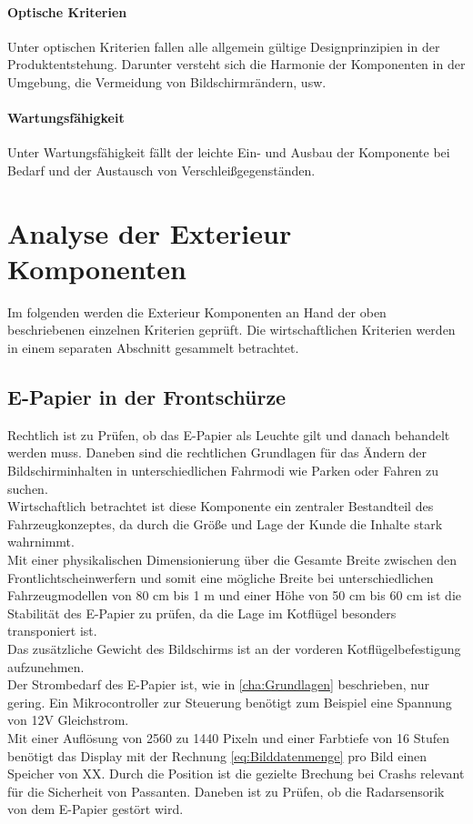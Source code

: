 \paragraph{Optische Kriterien}
Unter optischen Kriterien fallen alle allgemein gültige Designprinzipien in der Produktentstehung. Darunter versteht sich die Harmonie der Komponenten in der Umgebung, die Vermeidung von Bildschirmrändern, usw.
\paragraph{Wartungsfähigkeit}
Unter Wartungsfähigkeit fällt der leichte Ein- und Ausbau der Komponente bei Bedarf und der Austausch von Verschleißgegenständen.

\section{Analyse der Exterieur Komponenten}
Im folgenden werden die Exterieur Komponenten an Hand der oben beschriebenen einzelnen Kriterien geprüft. Die wirtschaftlichen Kriterien werden in einem separaten Abschnitt gesammelt betrachtet. 
\subsection{E-Papier in der Frontschürze}
Rechtlich ist zu Prüfen, ob das E-Papier als Leuchte gilt und danach behandelt werden muss. Daneben sind die rechtlichen Grundlagen für das Ändern der Bildschirminhalten in unterschiedlichen Fahrmodi wie Parken oder Fahren zu suchen. \\
Wirtschaftlich betrachtet ist diese Komponente ein zentraler Bestandteil des Fahrzeugkonzeptes, da durch die Größe und Lage der Kunde die Inhalte stark wahrnimmt. \\
Mit einer physikalischen Dimensionierung über die Gesamte Breite zwischen den Frontlichtscheinwerfern und somit eine mögliche Breite bei unterschiedlichen Fahrzeugmodellen von 80 cm bis 1 m und einer Höhe von 50 cm bis 60 cm ist die Stabilität des E-Papier zu prüfen, da die Lage im Kotflügel besonders transponiert ist. \\ 
Das zusätzliche Gewicht des Bildschirms ist an der vorderen Kotflügelbefestigung aufzunehmen.\\
Der Strombedarf des E-Papier ist, wie in \ref{cha:Grundlagen} beschrieben, nur gering. Ein Mikrocontroller zur Steuerung benötigt zum Beispiel eine Spannung von 12V Gleichstrom. \\
Mit einer Auflösung von 2560 zu 1440 Pixeln und einer Farbtiefe von 16 Stufen benötigt das Display mit der Rechnung \ref{eq:Bilddatenmenge} pro Bild einen Speicher von XX. 
Durch die Position ist die gezielte Brechung bei Crashs relevant für die Sicherheit von Passanten.
Daneben ist zu Prüfen, ob die Radarsensorik von dem E-Papier gestört wird.\\
